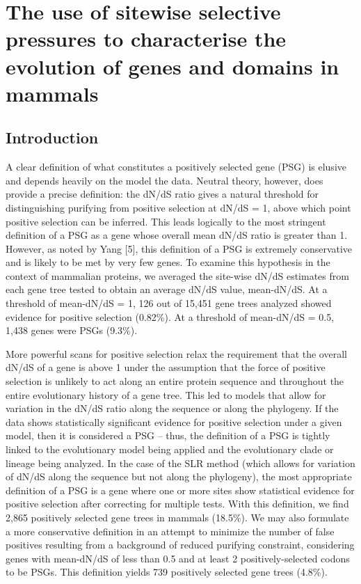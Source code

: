 \chapter{The use of sitewise selective pressures to characterise the evolution of genes and domains in mammals}
\section{Introduction}


A clear definition of what constitutes a positively selected gene
(PSG) is elusive and depends heavily on the model the data. Neutral
theory, however, does provide a precise definition: the dN/dS ratio
gives a natural threshold for distinguishing purifying from positive
selection at dN/dS = 1, above which point positive selection can be
inferred. This leads logically to the most stringent definition of a
PSG as a gene whose overall mean dN/dS ratio is greater than
1. However, as noted by Yang [5], this definition of a PSG is
extremely conservative and is likely to be met by very few genes. To
examine this hypothesis in the context of mammalian proteins, we
averaged the site-wise dN/dS estimates from each gene tree tested to
obtain an average dN/dS value, mean-dN/dS. At a threshold of
mean-dN/dS = 1, 126 out of 15,451 gene trees analyzed showed evidence
for positive selection (0.82\%).  At a threshold of mean-dN/dS = 0.5,
1,438 genes were PSGs (9.3\%).

More powerful scans for positive selection relax the requirement that
the overall dN/dS of a gene is above 1 under the assumption that the
force of positive selection is unlikely to act along an entire protein
sequence and throughout the entire evolutionary history of a gene
tree. This led to models that allow for variation in the dN/dS ratio
along the sequence or along the phylogeny. If the data shows
statistically significant evidence for positive selection under a
given model, then it is considered a PSG – thus, the definition of a
PSG is tightly linked to the evolutionary model being applied and the
evolutionary clade or lineage being analyzed. In the case of the SLR
method (which allows for variation of dN/dS along the sequence but not
along the phylogeny), the most appropriate definition of a PSG is a
gene where one or more sites show statistical evidence for positive
selection after correcting for multiple tests.  With this definition,
we find 2,865 positively selected gene trees in mammals (18.5\%). We
may also formulate a more conservative definition in an attempt to
minimize the number of false positives resulting from a background of
reduced purifying constraint, considering genes with mean-dN/dS of
less than 0.5 and at least 2 positively-selected codons to be
PSGs. This definition yields 739 positively selected gene trees
(4.8\%).

